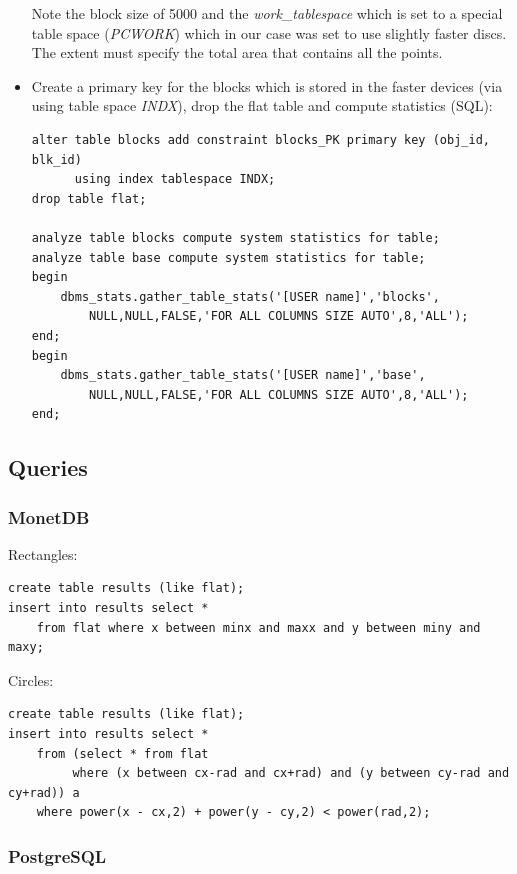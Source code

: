 \documentclass[a4paper,11pt]{article}
\begin{document}
\begin{itemize}
Note the block size of 5000 and the \textit{work\_tablespace} which is set to a special table space (\textit{PCWORK}) which in our case was set to use slightly faster discs. The extent must specify the total area that contains all the points.
	\item Create a primary key for the blocks which is stored in the faster devices (via using table space \textit{INDX}), drop the flat table and compute statistics (SQL):

\begin{verbatim}
alter table blocks add constraint blocks_PK primary key (obj_id, blk_id)
      using index tablespace INDX;
drop table flat;

analyze table blocks compute system statistics for table;
analyze table base compute system statistics for table;
begin
    dbms_stats.gather_table_stats('[USER name]','blocks',
        NULL,NULL,FALSE,'FOR ALL COLUMNS SIZE AUTO',8,'ALL');
end;
begin
    dbms_stats.gather_table_stats('[USER name]','base',
        NULL,NULL,FALSE,'FOR ALL COLUMNS SIZE AUTO',8,'ALL');
end;

\end{verbatim}	
\end{itemize}

\subsection{Queries}

\subsubsection{MonetDB}

Rectangles:
\begin{verbatim}
create table results (like flat);
insert into results select * 
    from flat where x between minx and maxx and y between miny and maxy;
\end{verbatim}

Circles:
\begin{verbatim}
create table results (like flat);
insert into results select * 
    from (select * from flat 
         where (x between cx-rad and cx+rad) and (y between cy-rad and cy+rad)) a 
    where power(x - cx,2) + power(y - cy,2) < power(rad,2);
\end{verbatim}

\subsubsection{PostgreSQL}
\end{document}
